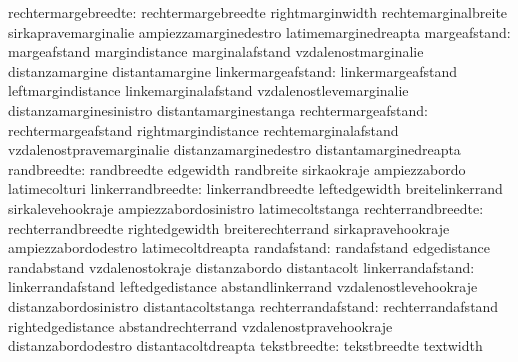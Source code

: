              rechtermargebreedte: rechtermargebreedte              rightmarginwidth
                                  rechtemarginalbreite             sirkapravemarginalie
                                  ampiezzamarginedestro            latimemarginedreapta
                    margeafstand: margeafstand                     margindistance
                                  marginalafstand                  vzdalenostmarginalie
                                  distanzamargine                  distantamargine
              linkermargeafstand: linkermargeafstand               leftmargindistance
                                  linkemarginalafstand             vzdalenostlevemarginalie
                                  distanzamarginesinistro          distantamarginestanga
             rechtermargeafstand: rechtermargeafstand              rightmargindistance
                                  rechtemarginalafstand            vzdalenostpravemarginalie
                                  distanzamarginedestro            distantamarginedreapta
                     randbreedte: randbreedte                      edgewidth
                                  randbreite                       sirkaokraje
                                  ampiezzabordo                    latimecolturi
               linkerrandbreedte: linkerrandbreedte                leftedgewidth
                                  breitelinkerrand                 sirkalevehookraje
                                  ampiezzabordosinistro            latimecoltstanga
              rechterrandbreedte: rechterrandbreedte               rightedgewidth
                                  breiterechterrand                sirkapravehookraje
                                  ampiezzabordodestro              latimecoltdreapta
                     randafstand: randafstand                      edgedistance
                                  randabstand                      vzdalenostokraje
                                  distanzabordo                    distantacolt
               linkerrandafstand: linkerrandafstand                leftedgedistance
                                  abstandlinkerrand                vzdalenostlevehookraje
                                  distanzabordosinistro            distantacoltstanga
              rechterrandafstand: rechterrandafstand               rightedgedistance
                                  abstandrechterrand               vzdalenostpravehookraje
                                  distanzabordodestro              distantacoltdreapta
                    tekstbreedte: tekstbreedte                     textwidth
